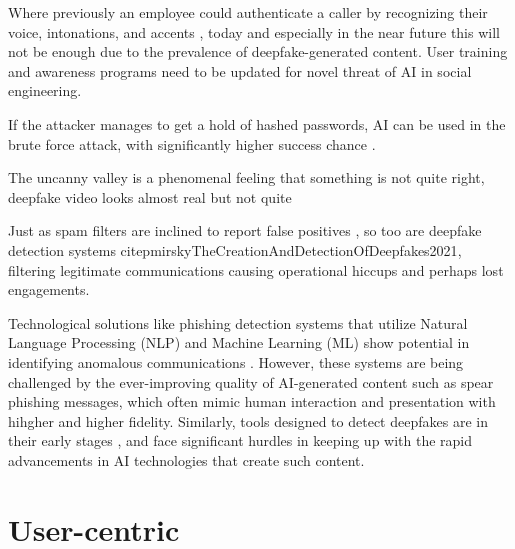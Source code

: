 Where previously an employee could authenticate a caller by recognizing their voice, intonations, and accents \citep{mitnick_The_Art_of_Deception_2003}, today and especially in the near future this will not be enough due to the prevalence of deepfake-generated content. User training and awareness programs need to be updated for novel threat of AI in social engineering.



If the attacker manages to get a hold of hashed passwords, AI can be used in the brute force attack, with significantly higher success chance \citep{blauthArtificialIntelligenceCrimeOverviewMaliciousUseAbuse2022}.

The uncanny valley is a phenomenal feeling that something is not quite right, deepfake video looks almost real but not quite


Just as spam filters are inclined to report false positives \citep{fakhouriAIDrivenSolutionsForSocialEngineeringAttacks2024}, so too are deepfake detection systems citep{mirskyTheCreationAndDetectionOfDeepfakes2021}, filtering legitimate communications causing operational hiccups and perhaps lost engagements.

Technological solutions like phishing detection systems that utilize Natural Language Processing (NLP) and Machine Learning (ML) show potential in identifying anomalous communications \citep{basitComprehensiveSurveyAIenabledPhishingAttacks2021}. However, these systems are being challenged by the ever-improving quality of AI-generated content such as spear phishing messages, which often mimic human interaction and presentation with hihgher and higher fidelity. Similarly, tools designed to detect deepfakes are in their early stages \citep{mirskyTheCreationAndDetectionOfDeepfakes2021}, and face significant hurdles in keeping up with the rapid advancements in AI technologies that create such content.










\section{User-centric}

\begin{comment}    
    - Deepfake content detection
    - Spear phishing detection
\end{comment}

